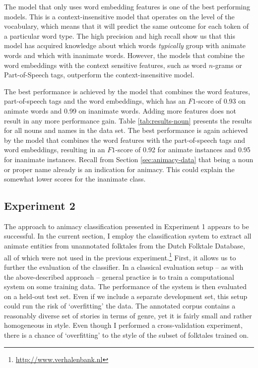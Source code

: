 The model that only uses word embedding features is one of the best performing models. This is a context-insensitive model that operates on the level of the vocabulary, which means that it will predict the same outcome for each token of a particular word type. The high precision and high recall show us that this model has acquired knowledge about which words \emph{typically} group with animate words and which with inanimate words. However, the models that combine the word embeddings with the context sensitive features, such as word $n$-grams or Part-of-Speech tags, outperform the context-insensitive model.

The best performance is achieved by the model that combines the word features, part-of-speech tags and the word embeddings, which has an $F1$-score of 0.93 on animate words and 0.99 on inanimate words. Adding more features does not result in any more performance gain. Table \ref{tab:results-noun} presents the results for all nouns and names in the data set. The best performance is again achieved by the model that combines the word features with the part-of-speech tags and word embeddings, resulting in an $F1$-score of 0.92 for animate instances and 0.95 for inanimate instances. Recall from Section \ref{sec:animacy-data} that being a noun or proper name already is an indication for animacy. This could explain the somewhat lower scores for the inanimate class.

\subsection{Experiment 2}\label{sec:animacy-exp-2}

The approach to animacy classification presented in Experiment 1 appears to be successful. In the current section, I employ the classification system to extract all animate entities from unannotated folktales from the Dutch Folktale Database, all of which were not used in the previous experiment.\footnote{\url{http://www.verhalenbank.nl}} First, it allows us to further the evaluation of the classifier. In a classical evaluation setup -- as with the above-described approach -- general practice is to train a computational system on some training data. The performance of the system is then evaluated on a held-out test set. Even if we include a separate development set, this setup could run the risk of `overfitting' the data. The annotated corpus contains a reasonably diverse set of stories in terms of genre, yet it is fairly small and rather homogeneous in style. Even though I performed a cross-validation experiment, there is a chance of `overfitting' to the style of the subset of folktales trained on. 

